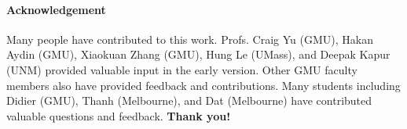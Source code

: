 \documentclass[oneside,11pt]{memoir}
\begin{document}
\paragraph{Acknowledgement} Many people have contributed to this work.
Profs. Craig Yu (GMU), Hakan Aydin (GMU), 
Xiaokuan Zhang (GMU), Hung Le (UMass), and Deepak Kapur (UNM) provided valuable input in the early version. Other GMU faculty members also have provided feedback and contributions.  Many students including Didier (GMU), Thanh (Melbourne), and Dat (Melbourne) have contributed valuable questions and feedback.
\textbf{Thank you!}



\end{document}
